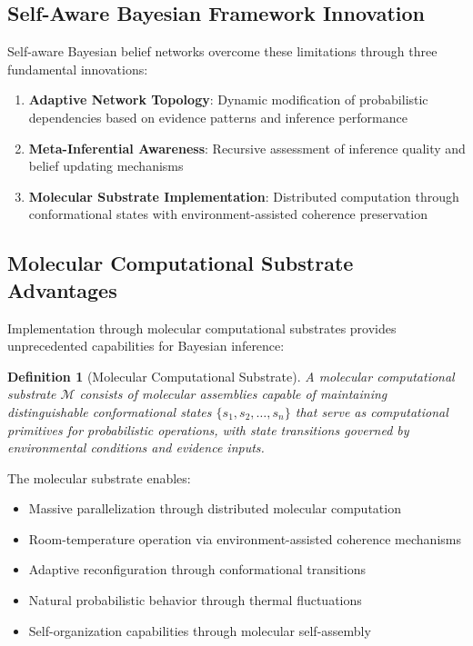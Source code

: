 \documentclass[12pt,a4paper]{article}
\newtheorem{definition}[theorem]{Definition}
\begin{document}
\subsection{Self-Aware Bayesian Framework Innovation}

Self-aware Bayesian belief networks overcome these limitations through three fundamental innovations:

\begin{enumerate}
\item \textbf{Adaptive Network Topology}: Dynamic modification of probabilistic dependencies based on evidence patterns and inference performance
\item \textbf{Meta-Inferential Awareness}: Recursive assessment of inference quality and belief updating mechanisms
\item \textbf{Molecular Substrate Implementation}: Distributed computation through conformational states with environment-assisted coherence preservation
\end{enumerate}

\subsection{Molecular Computational Substrate Advantages}

Implementation through molecular computational substrates provides unprecedented capabilities for Bayesian inference:

\begin{definition}[Molecular Computational Substrate]
A molecular computational substrate $\mathcal{M}$ consists of molecular assemblies capable of maintaining distinguishable conformational states $\{s_1, s_2, \ldots, s_n\}$ that serve as computational primitives for probabilistic operations, with state transitions governed by environmental conditions and evidence inputs.
\end{definition}

The molecular substrate enables:
\begin{itemize}
\item Massive parallelization through distributed molecular computation
\item Room-temperature operation via environment-assisted coherence mechanisms
\item Adaptive reconfiguration through conformational transitions
\item Natural probabilistic behavior through thermal fluctuations
\item Self-organization capabilities through molecular self-assembly
\end{itemize}
\end{document}
